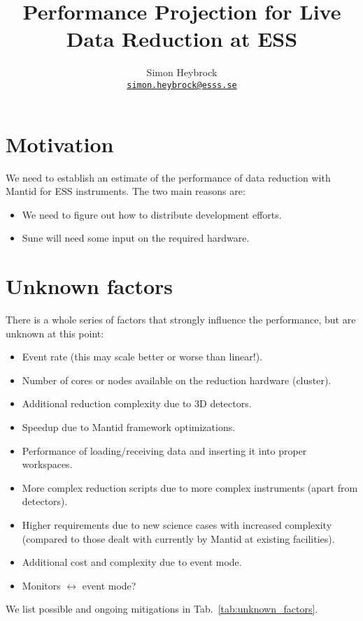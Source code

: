 \documentclass[a4paper,english,numbers=noenddot,bibliography=totoc,chapterprefix=on,DIV=12]{scrartcl}
\begin{document}
\title{Performance Projection for Live Data Reduction at ESS}
\author{Simon Heybrock\\
    {\small\href{mailto:simon.heybrock@esss.se}{\nolinkurl{simon.heybrock@esss.se}}}}

\maketitle

\tableofcontents


\section{Motivation}

We need to establish an estimate of the performance of data reduction with Mantid for ESS instruments.
The two main reasons are:
\begin{itemize}
    \item We need to figure out how to distribute development efforts.
    \item Sune will need some input on the required hardware.
\end{itemize}

\section{Unknown factors}

There is a whole series of factors that strongly influence the performance, but are unknown at this point:
\begin{itemize}
    \item Event rate (this may scale better or worse than linear!).
    \item Number of cores or nodes available on the reduction hardware (cluster).
    \item Additional reduction complexity due to 3D detectors.
    \item Speedup due to Mantid framework optimizations.
    \item Performance of loading/receiving data and inserting it into proper workspaces.
    \item More complex reduction scripts due to more complex instruments (apart from detectors).
    \item Higher requirements due to new science cases with increased complexity (compared to those dealt with currently by Mantid at existing facilities).
    \item Additional cost and complexity due to event mode.
    \item Monitors $\leftrightarrow$ event mode?
\end{itemize}
We list possible and ongoing mitigations in Tab.~\ref{tab:unknown_factors}.
\end{document}
